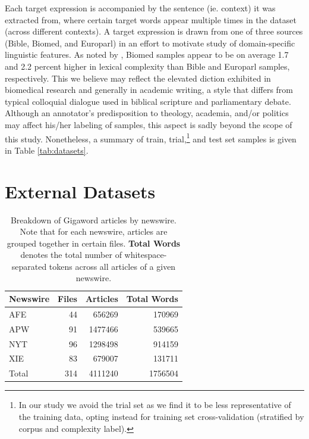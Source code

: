 \documentclass{dcthesis}
\theoremstyle{definition}
\theoremstyle{remark}
\begin{document}
Each target expression is accompanied by the sentence (ie. context) it was extracted from, where certain target words appear multiple times in the dataset (across different contexts). A target expression is drawn from one of three sources (Bible, Biomed, and Europarl) in an effort to motivate study of domain-specific linguistic features. As noted by \citet{shardlow2020complex}, Biomed samples appear to be on average 1.7 and 2.2 percent higher in lexical complexity than Bible and Europarl samples, respectively. This we believe may reflect the elevated diction exhibited in biomedical research and generally in academic writing, a style that differs from typical colloquial dialogue used in biblical scripture and parliamentary debate. Although an annotator's predisposition to theology, academia, and/or politics may affect his/her labeling of samples, this aspect is sadly beyond the scope of this study. Nonetheless, a summary of train, trial,\footnote{In our study we avoid the trial set as we find it to be less representative of the training data, opting instead for training set cross-validation (stratified by corpus and complexity label).} and test set samples is given in Table \ref{tab:datasets}.

\section{External Datasets}

\begin{table}
  \centering
  \begin{tabular}{l|rrr}
    \hline
    \centering
    \textbf{Newswire} & \textbf{Files} & \textbf{Articles} & \textbf{Total Words} \\
    \hline
    AFE & 44 &   656269 & 170969  \\
    APW & 91 &   1477466 & 539665\\
    NYT & 96 &   1298498 & 914159 \\
    XIE & 83 &   679007  & 131711\\
    \hline
    Total & 314 & 4111240 & 1756504\\
    \hline
  \end{tabular}
  \caption{\label{tab:gigaword_breakdown} Breakdown of Gigaword articles by newswire. Note that for each newswire, articles are grouped together in certain files. \textbf{Total Words} denotes the total number of whitespace-separated tokens across all articles of a given newswire.}
\end{table}
\end{document}
